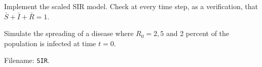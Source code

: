 \documentclass[graybox,sectrefs,envcountresetchap,open=right,final]{svmonodo}
\newenvironment{doconceexercise}{}{}
\begin{document}
\begin{doconceexercise}



Implement the scaled SIR model. Check at every time step,
as a verification, that
$\bar S + \bar I + \bar R = 1$.



Simulate the spreading of a disease where $R_0=2, 5$ and 2 percent of
the population is infected at time $t=0$.




\noindent Filename: \texttt{SIR}.

\end{doconceexercise}
\end{document}
